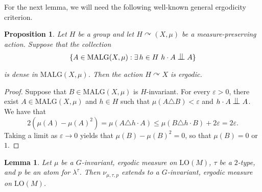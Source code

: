 \documentclass[11pt]{article}
\let\actson\curvearrowright
\let\eps\varepsilon
\let\sdiff\triangle
\theoremstyle{plain}
\newtheorem{lemma}[theorem]{Lemma}
\newtheorem{prop}[theorem]{Proposition}
\theoremstyle{definition}
\DeclarePairedDelimiter\set{\{}{\}}
\newcommand{\LO}{\mathrm{LO}}
\newcommand{\MALG}{\mathrm{MALG}}
\newcommand{\indep}[1][]{%
  \mathrel{
    \mathop{
      \scalebox{1}[1.3]{\text{$\perp\!\!\!\perp$}}
    }\displaylimits_{#1}
  }
}
\begin{document}
For the next lemma, we will need the following well-known general ergodicity criterion.
\begin{prop}
\label{p:indep-ergodicity}
Let $H$ be a group and let $H \actson (X, \mu)$ be a measure-preserving action. Suppose that the collection
\begin{equation*}
\set{A \in \MALG(X, \mu) : \exists\, h \in H \ h \cdot A \indep A}
\end{equation*}
is dense in $\MALG(X, \mu)$. Then the action $H \actson X$ is ergodic.
\end{prop}
\begin{proof}
Suppose that $B \in \MALG(X, \mu)$ is $H$-invariant. For every $\eps > 0$, there exist $A \in \MALG(X, \mu)$ and $h \in H$ such that $\mu(A \sdiff B) < \eps$ and $h \cdot A \indep A$. We have that
\begin{equation*}
2(\mu(A) - \mu(A)^2) = \mu(A \sdiff h \cdot A) \leq \mu(B \sdiff h \cdot B) + 2\eps = 2\eps.
\end{equation*}
Taking a limit as $\eps \to 0$ yields that $\mu(B) - \mu(B)^2 = 0$, so that $\mu(B) = 0$ or $1$.
\end{proof}
\begin{lemma}
\label{Lem:measures}
Let $\mu$ be a $G$-invariant, ergodic measure on $\LO(M)$, $\tau$ be a $2$-type, and $p$ be an atom for $\lambda^\tau$. Then $\nu_{\mu, \tau, p}$ extends to a $G$-invariant, ergodic measure on $\LO(M)$.
\end{lemma}
\end{document}
